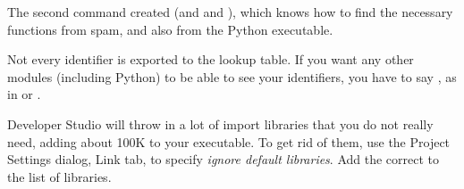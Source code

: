 The second command created  (and  and
), which knows how to find the necessary functions from
spam, and also from the Python executable.

Not every identifier is exported to the lookup table.  If you want any
other modules (including Python) to be able to see your identifiers,
you have to say , as in  or .

Developer Studio will throw in a lot of import libraries that you do
not really need, adding about 100K to your executable.  To get rid of
them, use the Project Settings dialog, Link tab, to specify
\emph{ignore default libraries}.  Add the correct
 to the list of libraries.
